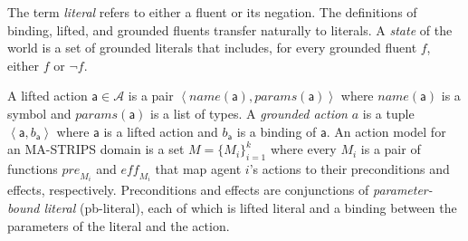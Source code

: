 \documentclass[letterpaper]{article} %
\newcommand{\pre}{\textit{pre}}
\newcommand{\eff}{\textit{eff}}
\theoremstyle{definition}
\theoremstyle{remark}
\newcommand{\tuple}[1]{\ensuremath{\left \langle #1 \right \rangle }}
\newcommand{\params}{\textit{params}}
\newcommand{\name}{\textit{name}}
\newcommand{\liftf}{\mathsf{f}}
\newcommand{\lifta}{\mathsf{a}}
\newcommand{\pbl}{pb-literal\xspace}
\newcommand{\roni}[1]{{\textcolor{red}{[Roni: #1]}}}
\begin{document}
The term \emph{literal} refers to either a fluent or its negation. 
The definitions of binding, lifted, and grounded fluents transfer naturally to literals. 
A \emph{state} of the world is a set of grounded literals that includes, for every grounded fluent $f$, either $f$ or $\neg f$. 


A lifted action $\lifta\in \mathcal{A}$ is a pair $\tuple{\name(\lifta), \params(\lifta)}$ 
where $\name(\lifta)$ is a symbol and $\params(\lifta)$ is a list of types. 
A \emph{grounded action} $a$ is a tuple $\tuple{\lifta, b_\lifta}$ where $\lifta$ is a lifted action and $b_\lifta$ is a binding of $\lifta$. 
An action model for an MA-STRIPS domain is a set $M=\{M_i\}_{i=1}^k$ where every $M_i$ is a pair of functions $\pre_{M_i}$ and $\eff_{M_i}$ that map agent $i$'s actions to their preconditions and effects, respectively. %
Preconditions and effects are conjunctions of \emph{parameter-bound literal} (\pbl), each of which is lifted literal and a binding between the parameters of the literal and the action. %
\end{document}
